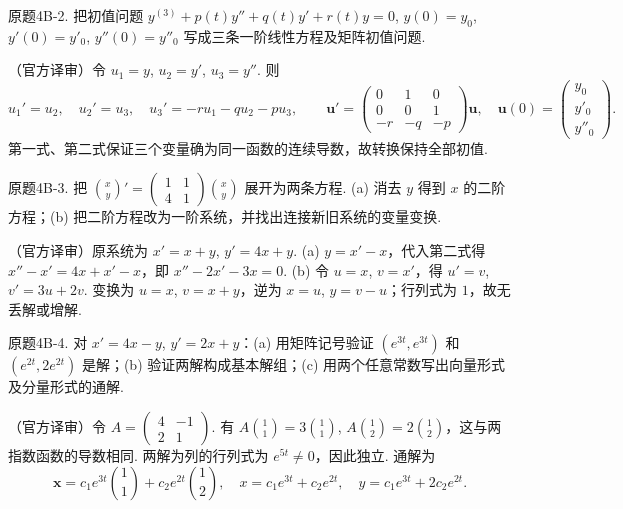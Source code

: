 \begin{exercise}\label{cw:bank-4B-2}原题4B-2. 把初值问题 $y^{(3)}+p(t)y''+q(t)y'+r(t)y=0$, $y(0)=y_0$, $y'(0)=y'_0$, $y''(0)=y''_0$ 写成三条一阶线性方程及矩阵初值问题.\end{exercise}
\begin{solution}（官方译审）令 $u_1=y$, $u_2=y'$, $u_3=y''$. 则
\[u_1'=u_2,\quad u_2'=u_3,\quad u_3'=-ru_1-qu_2-pu_3,
\qquad \mathbf u'=\begin{pmatrix}0&1&0\\0&0&1\\-r&-q&-p\end{pmatrix}\mathbf u,
\quad\mathbf u(0)=\begin{pmatrix}y_0\\y'_0\\y''_0\end{pmatrix}.\]
第一式、第二式保证三个变量确为同一函数的连续导数，故转换保持全部初值.\end{solution}
\begin{exercise}\label{cw:bank-4B-3}原题4B-3. 把 $\binom{x}{y}'=\begin{pmatrix}1&1\\4&1\end{pmatrix}\binom{x}{y}$ 展开为两条方程. (a) 消去 $y$ 得到 $x$ 的二阶方程；(b) 把二阶方程改为一阶系统，并找出连接新旧系统的变量变换.\end{exercise}
\begin{solution}（官方译审）原系统为 $x'=x+y$, $y'=4x+y$. (a) $y=x'-x$，代入第二式得 $x''-x'=4x+x'-x$，即 $x''-2x'-3x=0$. (b) 令 $u=x$, $v=x'$，得 $u'=v$, $v'=3u+2v$. 变换为 $u=x$, $v=x+y$，逆为 $x=u$, $y=v-u$；行列式为 $1$，故无丢解或增解.\end{solution}
\begin{exercise}\label{cw:bank-4B-4}原题4B-4. 对 $x'=4x-y$, $y'=2x+y$：(a) 用矩阵记号验证 $(e^{3t},e^{3t})$ 和 $(e^{2t},2e^{2t})$ 是解；(b) 验证两解构成基本解组；(c) 用两个任意常数写出向量形式及分量形式的通解.\end{exercise}
\begin{solution}（官方译审）令 $A=\begin{pmatrix}4&-1\\2&1\end{pmatrix}$. 有 $A\binom11=3\binom11$, $A\binom12=2\binom12$，这与两指数函数的导数相同. 两解为列的行列式为 $e^{5t}\ne0$，因此独立. 通解为
\[\mathbf x=c_1e^{3t}\binom11+c_2e^{2t}\binom12,
\quad x=c_1e^{3t}+c_2e^{2t},\quad y=c_1e^{3t}+2c_2e^{2t}.\]
\end{solution}
